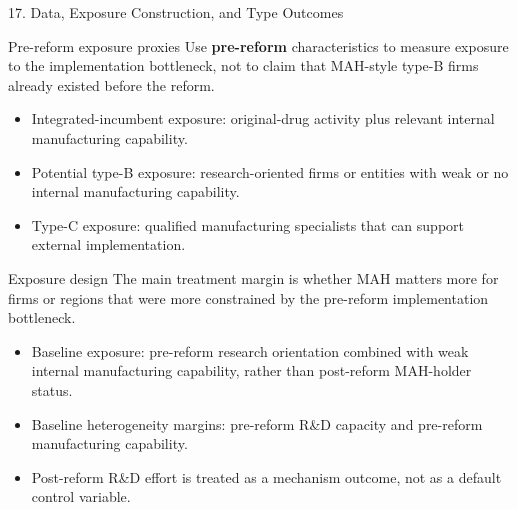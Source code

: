 \documentclass[aspectratio=169,11pt]{beamer}
\begin{document}
\begin{frame}{17. Data, Exposure Construction, and Type Outcomes}
\footnotesize
\begin{block}{Pre-reform exposure proxies}
Use \textbf{pre-reform} characteristics to measure exposure to the implementation bottleneck, not to claim that MAH-style type-B firms already existed before the reform.
\begin{itemize}
\item Integrated-incumbent exposure: original-drug activity plus relevant internal manufacturing capability.
\item Potential type-B exposure: research-oriented firms or entities with weak or no internal manufacturing capability.
\item Type-C exposure: qualified manufacturing specialists that can support external implementation.
\end{itemize}
\end{block}

\begin{block}{Exposure design}
The main treatment margin is whether MAH matters more for firms or regions that were more
constrained by the pre-reform implementation bottleneck.
\begin{itemize}
\item Baseline exposure: pre-reform research orientation combined with weak internal manufacturing capability, rather than post-reform MAH-holder status.
\item Baseline heterogeneity margins: pre-reform R\&D capacity and pre-reform manufacturing capability.
\item Post-reform R\&D effort is treated as a mechanism outcome, not as a default control variable.
\end{itemize}
\end{block}
\end{frame}
\end{document}
